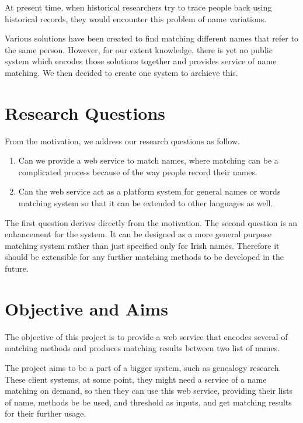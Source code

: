 At present time, when historical researchers try to trace people back
using historical records, they would encounter this problem of
name variations.

Various solutions have been created to find
matching different names that refer to the same person. However,
for our extent knowledge, there is yet no public system which encodes
those solutions together and provides service of name matching.
We then decided to create one system to archieve this.

\pagebreak

\section{Research Questions}
\label{sec:rq}

From the motivation, we address our research questions as follow.

\begin{enumerate}
  \item Can we provide a web service to match names, where matching can be
    a complicated process because of the way people record their names.
  \item Can the web service act as a platform system for general names or words
    matching system so that it can be extended to other languages as well.
\end{enumerate}

The first question derives directly from the motivation.
The second question is an enhancement for the system. It can be designed
as a more general purpose matching system rather than just specified
only for Irish names. Therefore it should be extensible for any further
matching methods to be developed in the future.

\section{Objective and Aims}

The objective of this project is to provide a web service that
encodes several of matching methods and produces matching
results between two list of names.


The project aims to be a part of a bigger system, such as
genealogy research. These client systems, at some point,
they might need a service of a name matching on demand, so then they can use this
web service, providing their lists of name, methods be be used,
and threshold as inputs, and get matching results for their further usage.

